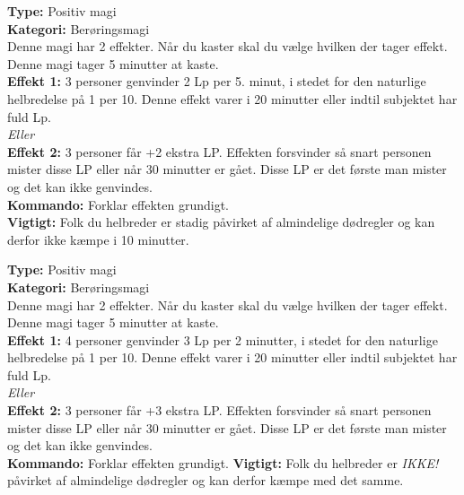 \begin{åndens gave*}
\textbf{Type:} Positiv magi\\
\textbf{Kategori:} Berøringsmagi\\
Denne magi har 2 effekter. Når du kaster skal du vælge hvilken der tager effekt. Denne magi tager 5 minutter at kaste.\\
\textbf{Effekt 1:} 3 personer genvinder 2 Lp per 5. minut, i stedet for den naturlige helbredelse på 1 per 10. Denne effekt varer i 20 minutter eller indtil subjektet har fuld Lp.\\
\emph{\textit{Eller}}\\
\textbf{Effekt 2:} 3 personer får +2 ekstra LP. Effekten forsvinder så snart personen mister disse LP eller når 30 minutter er gået. Disse LP er det første man mister og det kan ikke genvindes.\\
\textbf{Kommando:} Forklar effekten grundigt.\\
\textbf{Vigtigt:} Folk du helbreder er stadig påvirket af almindelige dødregler og kan derfor ikke kæmpe i 10 minutter.
\end{åndens gave*}


\begin{åndens gave*}
\textbf{Type:} Positiv magi\\
\textbf{Kategori:} Berøringsmagi\\
Denne magi har 2 effekter. Når du kaster skal du vælge hvilken der tager effekt. Denne magi tager 5 minutter at kaste.\\
\textbf{Effekt 1:} 4 personer genvinder 3 Lp per 2 minutter, i stedet for den naturlige helbredelse på 1 per 10. Denne effekt varer i 20 minutter eller indtil subjektet har fuld Lp.\\
\emph{\textit{Eller}}\\
\textbf{Effekt 2:} 3 personer får +3 ekstra LP. Effekten forsvinder så snart personen mister disse LP eller når 30 minutter er gået. Disse LP er det første man mister og det kan ikke genvindes.\\
\textbf{Kommando:} Forklar effekten grundigt.
\textbf{Vigtigt:} Folk du helbreder er \emph{IKKE!} påvirket af almindelige dødregler og kan derfor kæmpe med det
samme.
\end{åndens gave*}

